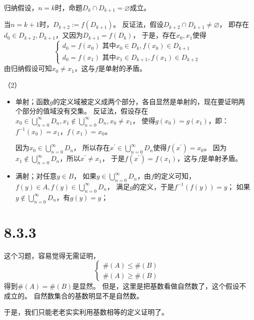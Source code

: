 \documentclass{article}
\begin{document}
归纳假设，$n = k$时，命题$D_{k} \cap D_{k+1} = \varnothing$成立。

当$n = k+1$时，$D_{k+2} := f(D_{k+1})$。
反证法，假设$D_{k+2} \cap D_{k+1} \neq \varnothing$，
即存在$d_0 \in D_{k+2}, D_{k+1}$，又因为$D_{k+1} = f(D_k)$，
于是，存在$x_0, x_1$使得
\begin{equation*}
  \begin{cases*}
    d_0 = f(x_0) \text{ 其中} x_0 \in D_k, f(x_0) \in D_{k+1} \\
    d_0 = f(x_{1}) \text{ 其中}  x_{1} \in D_{k+1}, f(x_1) \in D_{k+2}
  \end{cases*}
\end{equation*}
由归纳假设可知$x_0 \neq x_1$，这与$f$是单射的矛盾。

（2）
\begin{itemize}
  \item 单射；函数$g$的定义域被定义成两个部分，各自显然是单射的，现在要证明两个部分的值域没有交集。
        反证法，假设存在$x_0 \in \bigcup \limits_{n=0}^\infty D_n, x_1 \not \in \bigcup \limits_{n=0}^\infty D_n, x_0 \neq x_1$，
        使得$g(x_0) = g(x_1)$，即：$f^{-1}(x_0) = x_1$，$f(x_1) = x_0$。

        因为$x_0 \in \bigcup \limits_{n=0}^\infty D_n$，
        所以存在$x^\prime \in \bigcup \limits_{n=0}^\infty D_n$使得$f(x^\prime) = x_0$。
        因为$x_1 \not \in \bigcup \limits_{n=0}^\infty D_n$，所以$x^\prime \neq x_1$，
        于是$f(x^\prime) = f(x_1)$，这与$f$是单射矛盾。


  \item 满射；对任意$y \in B$，
        如果$y \in \bigcup \limits_{n=0}^\infty D_n$，由$f$的定义可知，
        $f(y) \in A, f(y) \in \bigcup \limits_{n=0}^\infty D_n$，
        满足$g$的定义，于是$f^{-1}(f(y)) = y$；
        如果$y \not \in \bigcup \limits_{n=0}^\infty D_n$，有$g(y) = y$；
\end{itemize}

\section*{8.3.3}

\begin{zremark}
  这个习题，容易觉得无需证明，
  \begin{equation*}
    \begin{cases*}
      \#(A) \leq \#(B) \\
      \#(A) \geq \#(B)
    \end{cases*}
  \end{equation*}
  得到$\#(A) = \#(B)$是显然。
  但是，这里是把基数看做自然数了，这个假设不成立的。
  自然数集合的基数明显不是自然数。

  于是，我们只能老老实实利用基数相等的定义证明了。
\end{zremark}
\end{document}
